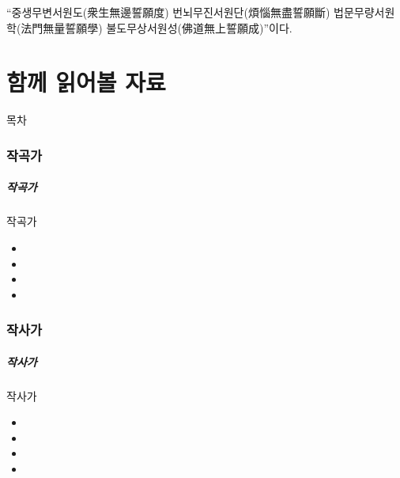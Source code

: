 \documentclass[aspectratio=1610,17pt,xcolor=pdftex,dvipsnames,table,handout]{beamer}
\begin{document}
“중생무변서원도(衆生無邊誓願度) 
번뇌무진서원단(煩惱無盡誓願斷) 
법문무량서원학(法門無量誓願學) 
불도무상서원성(佛道無上誓願成)”이다.

\newpage

		\part{ 함께 읽어볼 자료 }
		\frame{\partpage}
		
		\begin{frame} [plain]{목차}
		\tableofcontents%
		\end{frame}




		\section{ 작곡가 }
		\begin{frame} [t,plain]
		\frametitle{작곡가 }
			\begin{block} { 작곡가 }
			\setlength{\leftmargini}{4em}			
			\begin{itemize}
				\item 
				\item 
				\item 
				\item 
			\end{itemize}
			\end{block}						
								
		\end{frame} 	%


		\section{ 작사가 }
		\begin{frame} [t,plain]
		\frametitle{작사가 }
			\begin{block} { 작사가 }
			\setlength{\leftmargini}{4em}			
			\begin{itemize}
				\item 
				\item 
				\item 
				\item 
			\end{itemize}
			\end{block}						
								
		\end{frame} 	%
\end{document}

